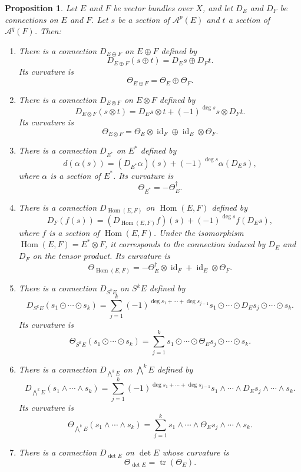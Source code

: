 \documentclass[10pt,a4paper]{article}
\newtheorem{prop}[theo]{Proposition}
\newcommand{\cc}[1]{\mathcal{#1}}
\DeclareMathOperator{\Hom}{Hom}
\DeclareMathOperator{\id}{id}
\DeclareMathOperator{\tr}{tr}
\begin{document}
\begin{prop}
  Let $E$ and $F$ be vector bundles over $X$, and let $D_E$ and $D_F$ be connections on $E$ and $F$. Let $s$ be a section of $\cc A^p(E)$ and $t$ a section of $\cc A^q(F)$. Then:
  \begin{enumerate}
\item There is a connection $D_{E \oplus F}$ on $E \oplus F$ defined by
\[
D_{E \oplus F}(s \oplus t) = D_E s \oplus D_F t.
\]
Its curvature is
\[
\Theta_{E \oplus F} = \Theta_E \oplus \Theta_F.
\]
\item There is a connection $D_{E \otimes F}$ on $E \otimes F$ defined by
\[
D_{E \otimes F}(s \otimes t)
= D_E s \otimes t + (-1)^{\deg s} s \otimes D_F t.
\]
Its curvature is
\[
\Theta_{E \otimes F} = \Theta_E \otimes \id_F \oplus \id_E \otimes \Theta_F.
\]
\item There is a connection $D_{E^*}$ on $E^*$ defined by
\[
d(\alpha(s))= (D_{E^*}\alpha)(s) + (-1)^{\deg s} \alpha(D_E s),
\]
where $\alpha$ is a section of $E^*$.
Its curvature is
\[
\Theta_{E^*} = -\Theta_E^{\dagger}.
\]
\item There is a connection $D_{\Hom(E,F)}$ on $\Hom(E,F)$ defined by
\[
D_F(f(s)) = (D_{\Hom(E,F)}f)(s) + (-1)^{\deg s} f(D_E s),
\]
where $f$ is a section of $\Hom(E,F)$. Under the isomorphism $\Hom(E,F) = E^* \otimes F$, it corresponds to the connection induced by $D_E$ and $D_F$ on the tensor product. Its curvature is
\[
\Theta_{\Hom(E,F)} = -\Theta_E^{\dagger} \otimes \id_F + \id_E \otimes \Theta_F.
\]
\item There is a connection $D_{S^kE}$ on $S^kE$ defined by
\[
D_{S^kE} (s_1 \odot \cdots \odot s_k)
= \sum_{j=1}^k (-1)^{\deg s_1 + \cdots + \deg s_{j-1}} s_1 \odot \cdots \odot D_E s_j \odot \cdots \odot s_k.
\]
Its curvature is
\[
\Theta_{S^kE} (s_1 \odot \cdots \odot s_k)
= \sum_{j=1}^k s_1 \odot \cdots \odot \Theta_E s_j \odot \cdots \odot s_k.
\]
\item There is a connection $D_{\bigwedge^kE}$ on $\bigwedge^k E$ defined by
\[
D_{\bigwedge^kE} (s_1 \wedge \cdots \wedge s_k)
= \sum_{j=1}^k (-1)^{\deg s_1 + \cdots + \deg s_{j-1}} s_1 \wedge \cdots \wedge D_E s_j \wedge \cdots \wedge s_k.
\]
Its curvature is
\[
\Theta_{\bigwedge^kE} (s_1 \wedge \cdots \wedge s_k)
= \sum_{j=1}^k s_1 \wedge \cdots \wedge \Theta_E s_j \wedge \cdots \wedge s_k.
\]
\item There is a connection $D_{\det E}$ on $\det E$ whose curvature is
\[
\Theta_{\det E}
= \tr(\Theta_E).
\]
\end{enumerate}
\end{prop}
\end{document}
